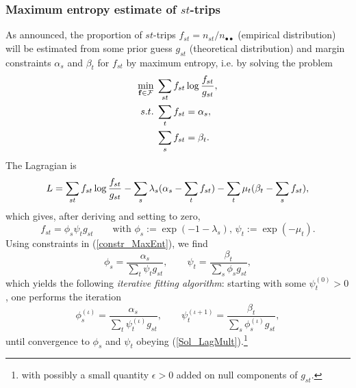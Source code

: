 \documentclass{bmcart}
\begin{document}
\subsubsection{Maximum entropy estimate of $st$-trips}
\label{maxenso}
As announced,  the proportion of $st$-trips $f_{st}=n_{st}/n_{\bullet\bullet}$ (empirical distribution) will be estimated from some prior guess $g_{st}$ (theoretical distribution) and 
margin constraints $\alpha_s$ and $\beta_t$ for $f_{st}$ by maximum entropy, i.e. by 
solving the problem 
\begin{align}
	\label{constr_MaxEnt}
	\min_{\mathbf{f}\in\mathcal{F}} &\; \sum_{st}f_{st}\log \frac{f_{st}}{g_{st}}, \notag \\
	s.t. &\; \sum_t f_{st} = \alpha_s, \notag \\
	&\; \sum_s f_{st} = \beta_t.
\end{align}
The Lagragian is
\begin{equation}
	L = \sum_{st}f_{st}\log \frac{f_{st}}{g_{st}} - \sum_s \lambda_s (\alpha_s - \sum_t f_{st}) - \sum_t \mu_t (\beta_t - \sum_s f_{st}), \notag
\end{equation}
which gives, after deriving and setting to zero,
\begin{equation}
	\label{Sol}
	f_{st} = \phi_s \psi_t g_{st} \qquad \text{with } \phi_s := \exp(- 1 - \lambda_s) \text{, } \psi_t := \exp(- \mu_t).
\end{equation}
Using constraints in (\ref{constr_MaxEnt}), we find
\begin{equation}
	\label{Sol_LagMult}
	\phi_s = \frac{\alpha_s}{\sum_t \psi_t g_{st}}, \qquad \psi_t = \frac{\beta_t}{\sum_s \phi_s g_{st}}, 
\end{equation}
which yields the following \emph{iterative fitting algorithm}: starting with some $\psi^{(0)}_t > 0$, one performs the iteration
\begin{equation}
	\label{Iterative fitting}
	\phi^{(\iota)}_s = \frac{\alpha_s}{\sum_t \psi^{(\iota)}_t g_{st}}, \qquad \psi^{(\iota + 1)}_t = \frac{\beta_t}{\sum_s \phi^{(\iota)}_s g_{st}}, 
\end{equation}
until convergence to $\phi_s$ and $\psi_t$ obeying (\ref{Sol_LagMult}).\footnote{with possibly a small quantity $\epsilon > 0$ added on null components of $g_{st}$.} 
\end{document}

